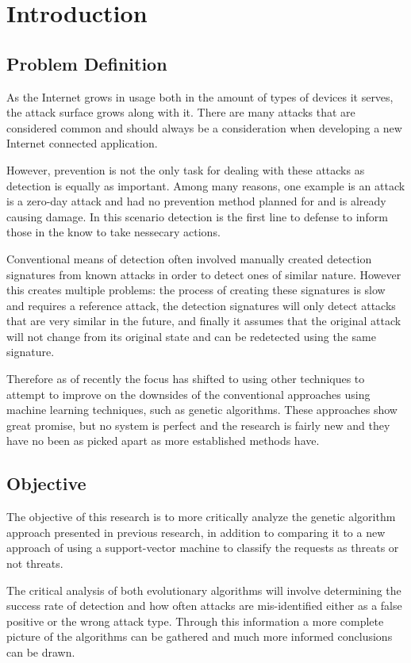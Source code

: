 \chapter{Introduction}
\section{Problem Definition}

As the Internet grows in usage both in the amount of types of devices it serves, the attack surface grows along with it.  There are many attacks that are considered common and should always be a consideration when developing a new Internet connected application.  

However, prevention is not the only task for dealing with these attacks as detection is equally as important.  Among many reasons, one example is an attack is a zero-day attack and had no prevention method planned for and is already causing damage.  In this scenario detection is the first line to defense to inform those in the know to take nessecary actions.  

Conventional means of detection often involved manually created detection signatures from known attacks in order to detect ones of similar nature. However this creates multiple problems: the process of creating these signatures is slow and requires a reference attack, the detection signatures will only detect attacks that are very similar in the future, and finally it assumes that the original attack will not change from its original state and can be redetected using the same signature.

Therefore as of recently the focus has shifted to using other techniques to attempt to improve on the downsides of the conventional approaches using machine learning techniques, such as genetic algorithms. These approaches show great promise, but no system is perfect and the research is fairly new and they have no been as picked apart as more established methods have. \cite{test}

\section{Objective}

The objective of this research is to more critically analyze the genetic algorithm approach presented in previous research, in addition to comparing it to a new approach of using a support-vector machine to classify the requests as threats or not threats.

The critical analysis of both evolutionary algorithms will involve determining the success rate of detection and how often attacks are mis-identified either as a false positive or the wrong attack type.  Through this information a more complete picture of the algorithms can be gathered and much more informed conclusions can be drawn.

